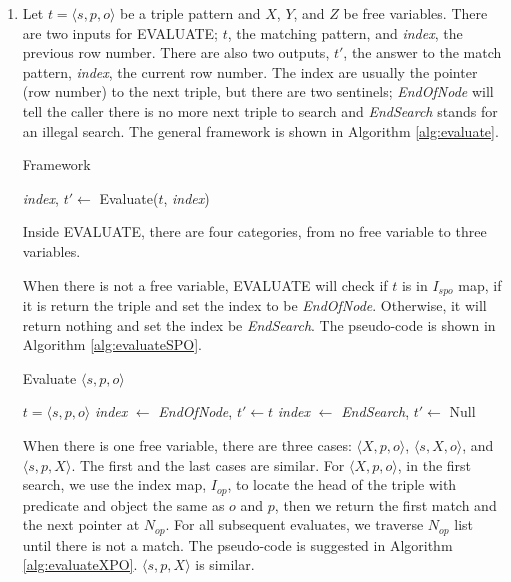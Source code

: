 \documentclass{article}
\begin{document}
\begin{enumerate}
\begin{enumerate}
\item 

 
Let $t = \langle s, p, o\rangle$ be a triple pattern and $X$, $Y$, and $Z$ be free variables. There are two inputs for EVALUATE; $t$, the matching pattern, and \textit{index}, the previous row number. There are also two outputs, $t'$, the answer to the match pattern, \textit{index}, the current row number. The index are usually the pointer (row number) to the next triple, but there are two sentinels; \textit{EndOfNode} will tell the caller there is no more next triple to search and \textit{EndSearch} stands for an illegal search. The general framework is shown in Algorithm \eqref{alg:evaluate}.

\begin{algorithm}[H]
\caption{Framework}\label{alg:evaluate}
\begin{algorithmic}

\State \textit{index}, $t' \leftarrow$ Evaluate($t$, \textit{index})
\EndWhile

\end{algorithmic}
\end{algorithm}

Inside EVALUATE, there are four categories, from no free variable to three variables. 

When there is not a free variable, EVALUATE will check if $t$ is in $I_{spo}$ map, if it is return the triple and set the index to be \textit{EndOfNode}. Otherwise, it will return nothing and set the index be \textit{EndSearch}. The pseudo-code is shown in Algorithm \eqref{alg:evaluateSPO}. 

\begin{algorithm}[H]
\caption{Evaluate $\langle s, p, o\rangle$}\label{alg:evaluateSPO}
\begin{algorithmic}
\Require $t = \langle s, p, o\rangle$
\State \textit{index} $\leftarrow$ \textit{EndOfNode}, $t'\leftarrow t$
\Else
\State \textit{index} $\leftarrow$ \textit{EndSearch}, $t'\leftarrow$ Null
\EndIf
\end{algorithmic}
\end{algorithm}

When there is one free variable, there are three cases: $\langle X, p, o\rangle$, $\langle s, X, o\rangle$, and $\langle s, p, X\rangle$. The first and the last cases are similar. For $\langle X, p, o\rangle$, in the first search, we use the index map, $I_{op}$, to locate the head of the triple with predicate and object the same as $o$ and $p$, then we return the first match and the next pointer at $N_{op}$. For all subsequent evaluates, we traverse $N_{op}$ list until there is not a match. The pseudo-code is suggested in Algorithm \eqref{alg:evaluateXPO}. $\langle s, p, X\rangle$ is similar. 
 

\end{enumerate}
\end{enumerate}
\end{document}
